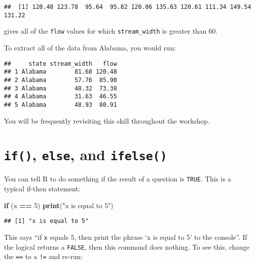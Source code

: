 \documentclass[]{book}
\newenvironment{Shaded}{\begin{snugshade}}{\end{snugshade}}
\newcommand{\KeywordTok}[1]{\textcolor[rgb]{0.13,0.29,0.53}{\textbf{#1}}}
\newcommand{\DecValTok}[1]{\textcolor[rgb]{0.00,0.00,0.81}{#1}}
\newcommand{\StringTok}[1]{\textcolor[rgb]{0.31,0.60,0.02}{#1}}
\newcommand{\ControlFlowTok}[1]{\textcolor[rgb]{0.13,0.29,0.53}{\textbf{#1}}}
\newcommand{\OperatorTok}[1]{\textcolor[rgb]{0.81,0.36,0.00}{\textbf{#1}}}
\newcommand{\NormalTok}[1]{#1}
\theoremstyle{definition}
\theoremstyle{definition}
\theoremstyle{definition}
\theoremstyle{remark}
\begin{document}
\begin{verbatim}
##  [1] 120.48 123.78  95.64  95.82 120.06 135.63 120.61 111.34 149.54 131.22
\end{verbatim}

gives all of the \texttt{flow} values for which \texttt{stream\_width}
is greater than 60.

To extract all of the data from Alabama, you would run:

\begin{Shaded}
\end{Shaded}

\begin{verbatim}
##     state stream_width   flow
## 1 Alabama        81.68 120.48
## 2 Alabama        57.76  85.90
## 3 Alabama        48.32  73.38
## 4 Alabama        31.63  46.55
## 5 Alabama        48.93  80.91
\end{verbatim}

You will be frequently revisiting this skill throughout the workshop.

\section{\texorpdfstring{\texttt{if()}, \texttt{else}, and
\texttt{ifelse()}}{if(), else, and ifelse()}}\label{if-else-and-ifelse}

You can tell R to do something if the result of a question is
\texttt{TRUE}. This is a typical if-then statement:

\begin{Shaded}
\begin{Highlighting}[]
\ControlFlowTok{if}\NormalTok{ (x }\OperatorTok{==}\StringTok{ }\DecValTok{5}\NormalTok{) }\KeywordTok{print}\NormalTok{(}\StringTok{"x is equal to 5"}\NormalTok{)}
\end{Highlighting}
\end{Shaded}

\begin{verbatim}
## [1] "x is equal to 5"
\end{verbatim}

This says ``if \texttt{x} equals 5, then print the phrase `x is equal to
5' to the console''. If the logical returns a \texttt{FALSE}, then this
command does nothing. To see this, change the \texttt{==} to a
\texttt{!=} and re-run:
\end{document}
